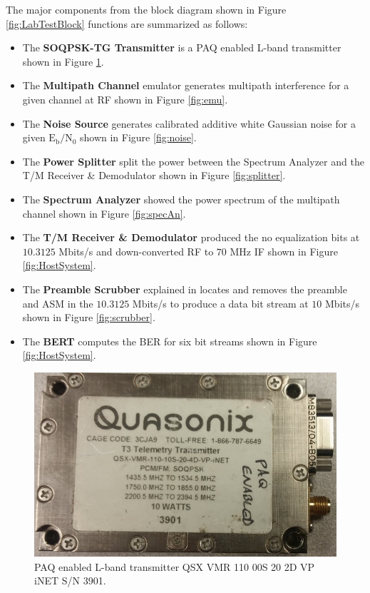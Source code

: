 \label{sec:appendxi_setup}
The major components from the block diagram shown in Figure \ref{fig:LabTestBlock} functions are summarized as follows:
\begin{itemize}
\item The \textbf{SOQPSK-TG Transmitter} is a PAQ enabled L-band transmitter shown in Figure \ref{fig:trans}.
\item The \textbf{Multipath Channel} emulator generates multipath interference for a given channel at RF shown in Figure \ref{fig:emu}.
\item The \textbf{Noise Source} generates calibrated additive white Gaussian noise for a given $\text{E}_\text{b}/\text{N}_\text{0}$ shown in Figure \ref{fig:noise}.
\item The \textbf{Power Splitter} split the power between the Spectrum Analyzer and the T/M Receiver \& Demodulator  shown in Figure \ref{fig:splitter}.
\item The \textbf{Spectrum Analyzer} showed the power spectrum of the multipath channel shown in Figure \ref{fig:specAn}.
\item The \textbf{T/M Receiver \& Demodulator} produced the no equalization bits at $10.3125$ Mbits/s and down-converted RF to $70$ MHz IF  shown in Figure \ref{fig:HostSystem}.
\item The \textbf{Preamble Scrubber} explained in \cite{hog2016} locates and removes the preamble and ASM in the $10.3125$ Mbits/s to produce a data bit stream at $10$ Mbits/s shown in Figure \ref{fig:scrubber}.
\item The \textbf{BERT} computes the BER for six bit streams shown in Figure \ref{fig:HostSystem}.
\end{itemize}
\clearpage
\begin{figure}
	\centering\includegraphics[scale=0.5]{figures/eq_GPUimplementation/trans.jpg}
	\caption{PAQ enabled L-band transmitter QSX VMR 110 00S 20 2D VP iNET S/N 3901.}
	\label{fig:trans}
\end{figure}
